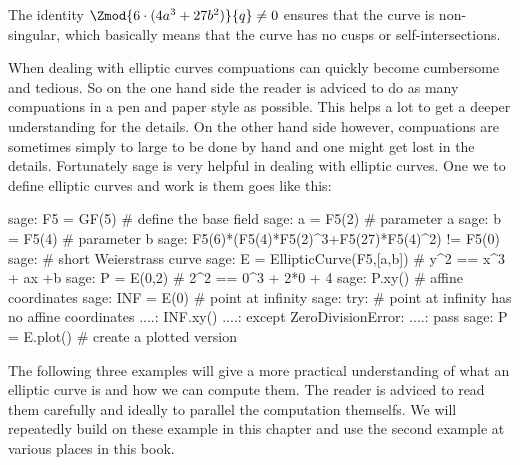 The identity $\Zmod{6\cdot(4a^3+ 27b^2)}{q}\neq 0$ ensures that the curve is  non-singular, which basically means that the curve has no cusps or self-intersections.

When dealing with elliptic curves compuations can quickly become cumbersome and tedious. So on the one hand side the reader is adviced to do as many compuations in a pen and paper style as possible. This helps a lot to get a deeper understanding for the details. On the other hand side however, compuations are sometimes simply to large to be done by hand and one might get lost in the details. Fortunately sage is very helpful in dealing with elliptic curves. One we to define elliptic curves and work is them goes like this:
\begin{sagecommandline}
sage: F5 = GF(5) # define the base field
sage: a = F5(2) # parameter a
sage: b = F5(4) # parameter b
sage: F5(6)*(F5(4)*F5(2)^3+F5(27)*F5(4)^2) != F5(0)
sage: # short Weierstrass curve 
sage: E = EllipticCurve(F5,[a,b]) # y^2 == x^3 + ax +b 
sage: P = E(0,2) # 2^2 == 0^3 + 2*0 + 4
sage: P.xy() # affine coordinates
sage: INF = E(0) # point at infinity
sage: try: 	# point at infinity has no affine coordinates
....:     INF.xy()
....: except ZeroDivisionError:
....:     pass
sage: P = E.plot() # create a plotted version 
\end{sagecommandline}
The following three examples will give a more practical understanding of what an elliptic curve is and how we can compute them. The reader is adviced to read them carefully and ideally to parallel the computation themselfs. We will repeatedly build on these example in this chapter and use the second example at various places in this book.
